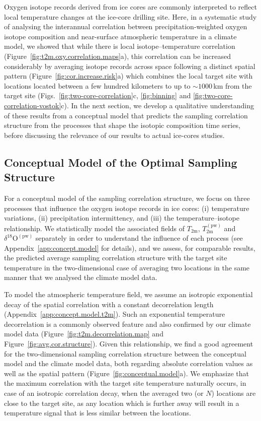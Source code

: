 \documentclass[draft]{agujournal2019}
\begin{document}
Oxygen isotope records derived from ice cores are commonly interpreted to
reflect local temperature changes at the ice-core drilling site. Here, in a
systematic study of analysing the interannual correlation between
precipitation-weighted oxygen isotope composition and near-surface atmospheric
temperature in a climate model, we showed that while there is local
isotope--temperature correlation (Figure~\ref{fig:t2m.oxy.correlation.maps}a),
this correlation can be increased considerably by averaging isotope records
across space following a distinct spatial pattern
(Figure~\ref{fig:cor.increase.risk}a) which combines the local target site with
locations located between a few hundred kilometers to up to $\sim1000$\,km from
the target site (Figs.~\ref{fig:two-core-correlation}c, \ref{fig:binning} and
\ref{fig:two-core-correlation-vostok}c). In the next section, we develop a
qualitative understanding of these results from a conceptual model that predicts
the sampling correlation structure from the processes that shape the isotopic
composition time series, before discussing the relevance of our results to
actual ice-cores studies.

\subsection{Conceptual Model of the Optimal Sampling Structure}
\label{discussion:concept.model}

For a conceptual model of the sampling correlation structure, we focus on three
processes that influence the oxygen isotope records in ice cores: (i)
temperature variations, (ii) precipitation intermittency, and (iii) the
temperature--isotope relationship. We statistically model the associated fields
of $T_{\mathrm{2m}}$, $T_{2\mathrm{m}}^{\mathrm{(pw)}}$ and
$\delta^{18}\mathrm{O}^{\mathrm{(pw)}}$ separately in order to understand the
influence of each process (see Appendix~\ref{app:concept.model} for details),
and we assess, for comparable results, the predicted average sampling
correlation structure with the target site temperature in the two-dimensional
case of averaging two locations in the same manner that we analysed the climate
model data.

To model the atmospheric temperature field, we assume an isotropic exponential
decay of the spatial correlation with a constant decorrelation length
(Appendix~\ref{app:concept.model.t2m}). Such an exponential temperature
decorrelation is a commonly observed feature \cite{Jones1997} and also
confirmed by our climate model data (Figure~\ref{fig:t2m.decorrelation.map} and
Figure~\ref{fig:avg.cor.structure}). Given this relationship, we find a good
agreement for the two-dimensional sampling correlation structure between the
conceptual model and the climate model data, both regarding absolute correlation
values as well as the spatial pattern (Figure~\ref{fig:conceptual.model}a). We
emphasize that the maximum correlation with the target site temperature
naturally occurs, in case of an isotropic correlation decay, when the averaged
two (or $N$) locations are close to the target site, as any location which is
further away will result in a temperature signal that is less similar between
the locations.
\end{document}
